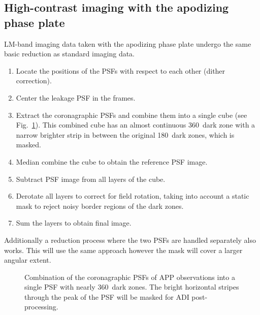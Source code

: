 \subsection{High-contrast imaging with the apodizing phase plate}
\label{ssec:algo_app_imaging}

LM-band imaging data taken with the apodizing phase plate undergo the
same basic reduction as standard imaging data. %



\begin{enumerate}
\item Locate the positions of the PSFs with respect to each other
  (dither correction).
\item Center the leakage PSF in the frames.
\item Extract the coronagraphic PSFs and combine them into a single
  cube (see Fig.~\ref{fig:app_psf_combine}). This combined cube has an almost continuous 
  360\degr\ dark zone with a narrow brighter strip in between the original 180\degr\ dark zones, which is masked.
\item Median combine the cube to obtain the reference PSF image.
\item Subtract PSF image from all layers of the cube.
\item Derotate all layers to correct for field rotation, taking into
  account a static mask to reject noisy border regions of the dark
  zones.
\item Sum the layers to obtain final image.
\end{enumerate}

Additionally a reduction process where the two PSFs are handled separately also works. This will use the same approach however the mask will cover a larger angular extent.

\begin{figure}
  \centering
    \caption[Combination of the coronagraphic PSFs of APP observations into a single PSF]{%
        Combination of the coronagraphic PSFs of APP observations
        into a single PSF with nearly 360\degr\ dark zones. The bright
        horizontal stripes through the peak of the PSF will be masked for
        ADI post-processing.}
  \label{fig:app_psf_combine}
\end{figure}


